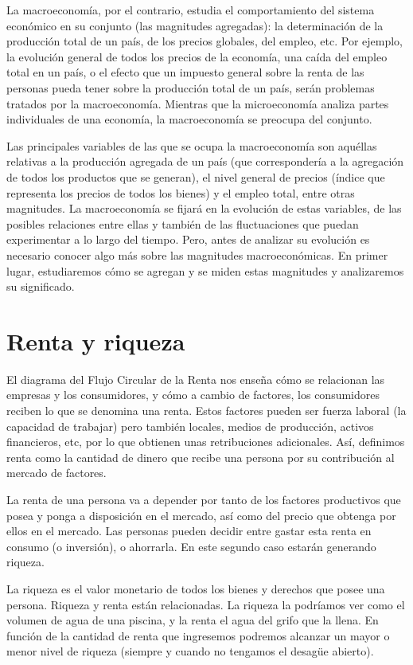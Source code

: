 \documentclass[
]{krantz}
\begin{document}
La macroeconomía, por el contrario, estudia el comportamiento del sistema económico en su conjunto (las magnitudes agregadas): la determinación de la producción total de un país, de los precios globales, del empleo, etc. Por ejemplo, la evolución general de todos los precios de la economía, una caída del empleo total en un país, o el efecto que un impuesto general sobre la renta de las personas pueda tener sobre la producción total de un país, serán problemas tratados por la macroeconomía. Mientras que la microeconomía analiza partes individuales de una economía, la macroeconomía se preocupa del conjunto.

Las principales variables de las que se ocupa la macroeconomía son aquéllas relativas a la producción agregada de un país (que correspondería a la agregación de todos los productos que se generan), el nivel general de precios (índice que representa los precios de todos los bienes) y el empleo total, entre otras magnitudes. La macroeconomía se fijará en la evolución de estas variables, de las posibles relaciones entre ellas y también de las fluctuaciones que puedan experimentar a lo largo del tiempo. Pero, antes de analizar su evolución es necesario conocer algo más sobre las magnitudes macroeconómicas. En primer lugar, estudiaremos cómo se agregan y se miden estas magnitudes y analizaremos su significado.

\hypertarget{renta-y-riqueza}{%
\section{Renta y riqueza}\label{renta-y-riqueza}}

El diagrama del Flujo Circular de la Renta nos enseña cómo se relacionan las empresas y los consumidores, y cómo a cambio de factores, los consumidores reciben lo que se denomina una renta. Estos factores pueden ser fuerza laboral (la capacidad de trabajar) pero también locales, medios de producción, activos financieros, etc, por lo que obtienen unas retribuciones adicionales. Así, definimos renta como la cantidad de dinero que recibe una persona por su contribución al mercado de factores.

La renta de una persona va a depender por tanto de los factores productivos que posea y ponga a disposición en el mercado, así como del precio que obtenga por ellos en el mercado. Las personas pueden decidir entre gastar esta renta en consumo (o inversión), o ahorrarla. En este segundo caso estarán generando riqueza.

La riqueza es el valor monetario de todos los bienes y derechos que posee una persona. Riqueza y renta están relacionadas. La riqueza la podríamos ver como el volumen de agua de una piscina, y la renta el agua del grifo que la llena. En función de la cantidad de renta que ingresemos podremos alcanzar un mayor o menor nivel de riqueza (siempre y cuando no tengamos el desagüe abierto).
\end{document}
